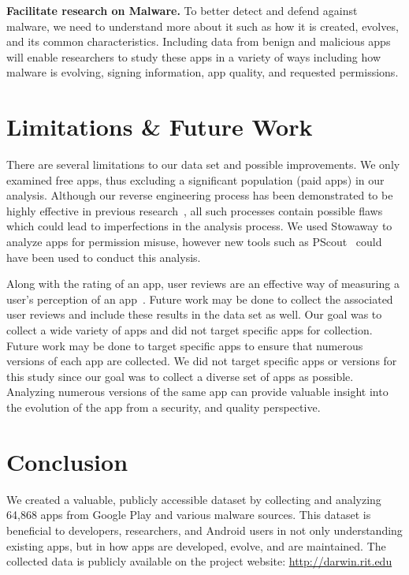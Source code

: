 \documentclass{sig-alternate-05-2015}
\begin{document}
\textbf{Facilitate research on Malware.}
To better detect and defend against malware, we need to understand more about it such as how it is created, evolves, and its common characteristics. Including data from benign and malicious apps will enable researchers to study these apps in a variety of ways including how malware is evolving, signing information, app quality, and requested permissions.





\section{Limitations \& Future Work}
\label{sec: Limitations}

There are several limitations to our data set and possible improvements. We only examined free apps, thus excluding a significant population (paid apps) in our analysis. Although our reverse engineering process has been demonstrated to be highly effective in previous research~\cite{chawla2014transfiguring}, all such processes contain possible flaws which could lead to imperfections in the analysis process. We used Stowaway to analyze apps for permission misuse, however new tools such as PScout~\cite{au2012pscout} could have been used to conduct this analysis.

Along with the rating of an app, user reviews are an effective way of measuring a user's perception of an app~\cite{khalid2015examining}. Future work may be done to collect the associated user reviews and include these results in the data set as well. Our goal was to collect a wide variety of apps and did not target specific apps for collection. Future work may be done to target specific apps to ensure that numerous versions of each app are collected. We did not target specific apps or versions for this study since our goal was to collect a diverse set of apps as possible. Analyzing numerous versions of the same app can provide valuable insight into the evolution of the app from a security, and quality perspective.


\section{Conclusion}
\label{sec: conclusion}

We created a valuable, publicly accessible dataset by collecting and analyzing 64,868 apps from Google Play and various malware sources. This dataset is beneficial to developers, researchers, and Android users in not only understanding existing apps, but in how apps are developed, evolve, and are maintained. The collected data is publicly available on the project website: \url{http://darwin.rit.edu}

\balance



\end{document}
